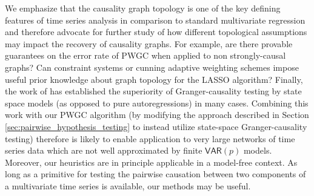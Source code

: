 \documentclass{statsoc}
\def\VAR{\mathsf{VAR}}  %
\begin{document}
We emphasize that the causality graph topology is one of the key
defining features of time series analysis in comparison to standard
multivariate regression and therefore advocate for further study of
how different topological assumptions may impact the recovery of
causality graphs.  For example, are there provable guarantees on the
error rate of PWGC when applied to non strongly-causal graphs?  Can
constraint systems or cunning adaptive weighting schemes impose useful
prior knowledge about graph topology for the LASSO algorithm?
Finally, the work of \cite{barnett2015granger} has established the
superiority of Granger-causality testing by state space models (as
opposed to pure autoregressions) in many cases.  Combining this work
with our PWGC algorithm (by modifying the approach described in
Section \ref{sec:pairwise_hypothesis_testing} to instead utilize
state-space Granger-causality testing) therefore is likely to enable
application to very large networks of time series data which are not
well approximated by finite $\VAR(p)$ models.  Moreover, our
heuristics are in principle applicable in a model-free context.  As
long as a primitive for testing the pairwise causation between two
components of a multivariate time series is available, our methods may
be useful.


\end{document}
